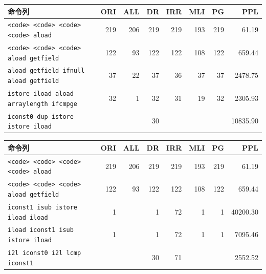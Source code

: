 \documentclass[12pt,twoside]{jbook}
\begin{document}
\begin{table}[t]
{  
  \begin{tabular}{lrrrrrrr}
   命令列 &
    \multicolumn{1}{p{1cm}}{ORI} & 
    \multicolumn{1}{p{1cm}}{ALL} & 
    \multicolumn{1}{p{1cm}}{DR} & 
    \multicolumn{1}{p{1cm}}{IRR} & 
    \multicolumn{1}{p{1cm}}{MLI} & 
    \multicolumn{1}{p{1cm}}{PG} & 
    \multicolumn{1}{p{1cm}}{PPL} \\ \hline
      \texttt{<code> <code> <code> <code> aload}    & 219 & 206 & 219 & 219 & 193 & 219 & 61.19 \\
    \texttt{<code> <code> <code> aload getfield}    & 122 &  93 & 122 & 122 & 108 & 122 & 659.44 \\
    \texttt{aload getfield ifnull aload getfield}   & 37  &  22 &  37 &  36 &  37 &  37 & 2478.75 \\
    \texttt{istore iload aload arraylength ifcmpge} & 32  &   1 &  32 &  31 &  19 &  32 & 2305.93 \\
    \texttt{iconst0 dup istore istore iload}        &     &     &  30 &     &     &     & 10835.90\\
  \end{tabular}
  
  
  \begin{tabular}{lrrrrrrr}
   命令列 &
    \multicolumn{1}{p{1cm}}{ORI} & 
    \multicolumn{1}{p{1cm}}{ALL} & 
    \multicolumn{1}{p{1cm}}{DR} & 
    \multicolumn{1}{p{1cm}}{IRR} & 
    \multicolumn{1}{p{1cm}}{MLI} & 
    \multicolumn{1}{p{1cm}}{PG} & 
    \multicolumn{1}{p{1cm}}{PPL} \\ \hline
   \texttt{<code> <code> <code> <code> aload}      & 219 & 206 & 219 & 219 & 193 & 219 & 61.19 \\
    \texttt{<code> <code> <code> aload getfield}   & 122 &  93 & 122 & 122 & 108 & 122 & 659.44 \\
    \texttt{iconst1 isub istore iload iload}       &   1 &     &   1 &  72 &   1 &   1 & 40200.30 \\
    \texttt{iload iconst1 isub istore iload}       &   1 &     &   1 &  72 &   1 &   1 & 7095.46 \\
    \texttt{i2l iconst0 i2l lcmp iconst1}          &     &     &  30 &  71 &     &     & 2552.52 \\
  \end{tabular}
  
}
\end{table}
\end{document}
